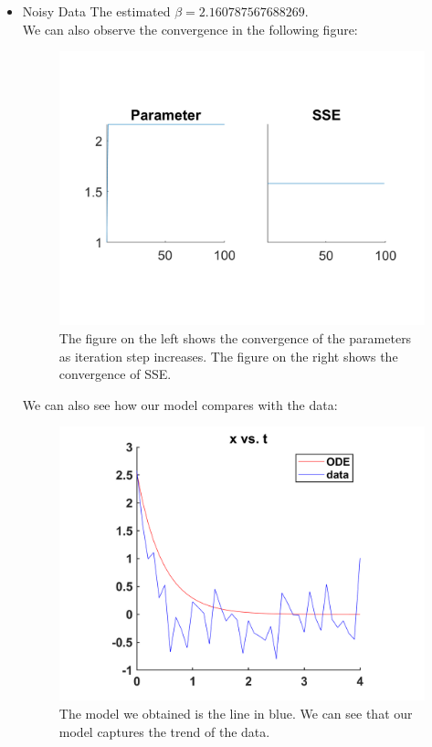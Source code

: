 \documentclass{article}
\begin{document}
\begin{itemize}
\item Noisy Data
The estimated $\beta=2.160787567688269$.\\
We can also observe the convergence in the following figure:
\begin{figure}[H]
\centering
\includegraphics[scale=0.3]{figures/p_b_conv_1.png}
\caption{The figure on the left shows the convergence of the parameters as iteration step increases. The figure on the right shows the convergence of SSE.}
\end{figure}

We can also see how our model compares with the data:
\begin{figure}[H]
\centering
\includegraphics[scale=0.2]{figures/p_b_data_1.png}
\caption{The model we obtained is the line in blue. We can see that our model captures the trend of the data.}
\end{figure}

\end{itemize}
\end{document}
